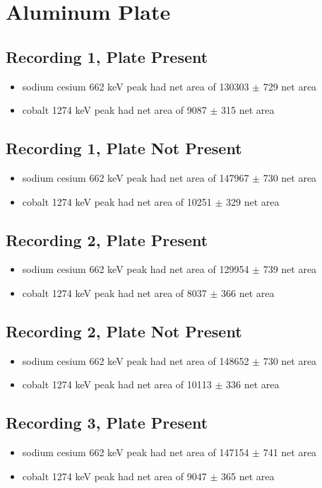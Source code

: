 \documentclass[a4paper]{article}
\begin{document}
\section{Aluminum Plate}

\subsection{Recording 1, Plate Present}
\begin{itemize}
    \item sodium cesium 662 keV peak had net area of 130303 $\pm$ 729 net area
    \item cobalt 1274 keV peak had net area of 9087 $\pm$ 315 net area
\end{itemize}
\subsection{Recording 1, Plate Not Present}
\begin{itemize}
    \item sodium cesium 662 keV peak had net area of 147967 $\pm$ 730 net area
    \item cobalt 1274 keV peak had net area of 10251 $\pm$ 329 net area
\end{itemize}
\subsection{Recording 2, Plate Present}
\begin{itemize}
    \item sodium cesium 662 keV peak had net area of 129954 $\pm$ 739 net area
    \item cobalt 1274 keV peak had net area of 8037 $\pm$ 366 net area
\end{itemize}
\subsection{Recording 2, Plate Not Present}
\begin{itemize}
    \item sodium cesium 662 keV peak had net area of 148652 $\pm$ 730 net area
    \item cobalt 1274 keV peak had net area of 10113 $\pm$ 336 net area
\end{itemize}
\subsection{Recording 3, Plate Present}
\begin{itemize}
    \item sodium cesium 662 keV peak had net area of 147154 $\pm$ 741 net area
    \item cobalt 1274 keV peak had net area of 9047 $\pm$ 365 net area
\end{itemize}
\end{document}
